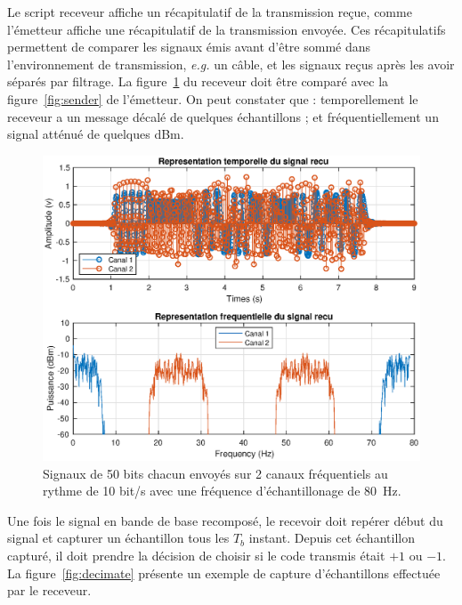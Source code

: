 \documentclass[10pt, oneside, a4paper]{article}
\begin{document}
Le script receveur affiche un récapitulatif de la transmission reçue, comme l'émetteur affiche une récapitulatif de la transmission envoyée.
Ces récapitulatifs permettent de comparer les signaux émis avant d'être sommé dans l'environnement de transmission, \textit{e.g.} un câble, et les signaux reçus après les avoir séparés par filtrage.
La figure~\ref{fig:receiver} du receveur doit être comparé avec la figure~\ref{fig:sender} de l'émetteur.
On peut constater que : temporellement le receveur a un message décalé de quelques échantillons ; et fréquentiellement un signal atténué de quelques dBm.

\begin{figure}[htbp]
	\centering
	\includegraphics[height=0.45\textheight]{eps/receiver.eps}
	\caption{Signaux de 50 bits chacun envoyés sur 2 canaux fréquentiels au rythme de 10 bit/s
			 avec une fréquence d'échantillonage de \SI{80}{\hertz}.}
	\label{fig:receiver}
\end{figure}

Une fois le signal en bande de base recomposé, le recevoir doit repérer début du signal et capturer un échantillon tous les $T_b$ instant.
Depuis cet échantillon capturé, il doit prendre la décision de choisir si le code transmis était $+1$ ou $-1$.
La figure~\ref{fig:decimate} présente un exemple de capture d'échantillons effectuée par le receveur.
\end{document}
